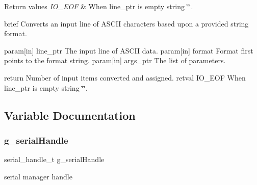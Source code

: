 \begin{DoxyRetVals}{Return values}
{\em I\+O\+\_\+\+E\+OF} & When line\+\_\+ptr is empty string \char`\"{}\char`\"{}.\\
\hline
\end{DoxyRetVals}
brief Converts an input line of A\+S\+C\+II characters based upon a provided string format.

param\mbox{[}in\mbox{]} line\+\_\+ptr The input line of A\+S\+C\+II data. param\mbox{[}in\mbox{]} format Format first points to the format string. param\mbox{[}in\mbox{]} args\+\_\+ptr The list of parameters.

return Number of input items converted and assigned. retval I\+O\+\_\+\+E\+OF When line\+\_\+ptr is empty string \char`\"{}\char`\"{}. 

\subsection{Variable Documentation}
\mbox{\label{group__debugconsole_gaad3c4240a1364156a239471ccdb9aa0b}} 
\subsubsection{\texorpdfstring{g\_serialHandle}{g\_serialHandle}}
{\footnotesize\ttfamily serial\+\_\+handle\+\_\+t g\+\_\+serial\+Handle}

serial manager handle 